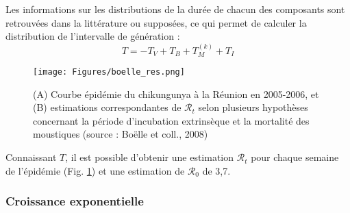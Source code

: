 Les informations sur les distributions de la durée de chacun des composants sont retrouvées dans la littérature ou supposées, ce qui permet de calculer la distribution de l'intervalle de génération :
\begin{equation}
T = -T_V + T_B + T_M^{(k)} + T_I
\end{equation}
\begin{figure}[t]
	\centering
	\texttt{[image: Figures/boelle\_res.png]}
	\caption{(A) Courbe épidémie du chikungunya à la Réunion en 2005-2006, et (B) estimations correspondantes de $\mathcal{R}_t$ selon plusieurs hypothèses concernant la période d'incubation extrinsèque et la mortalité des moustiques (source : Boëlle et coll., 2008)}
	\label{fig:boelle_res}
\end{figure}
Connaissant $T$, il est possible d'obtenir une estimation $\mathcal{R}_t$ pour chaque semaine de l'épidémie (Fig. \ref{fig:boelle_res}) et une estimation de $\mathcal{R}_0$ de 3,7.

\subsubsection{Croissance exponentielle}

